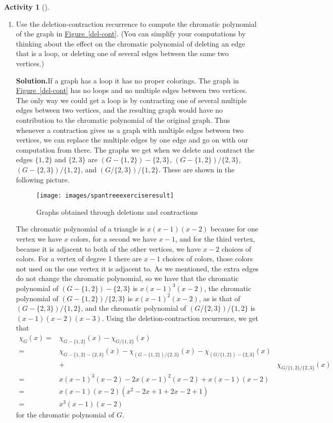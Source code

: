 \documentclass[10pt,]{book}
\theoremstyle{plain}
\theoremstyle{definition}
\newtheorem{activity}[project]{Activity}
\numberwithin{equation}{chapter}
\newcommand{\amp}{&}
\begin{document}
\begin{activity}[]
\begin{enumerate}[label=(\alph*)]
~\par
\item Use the deletion-contraction recurrence to compute the chromatic polynomial of the graph in \hyperref[del-cont]{Figure~\ref{del-cont}}. (You can simplify your computations by thinking about the effect on the chromatic polynomial of deleting an edge that is a loop, or deleting one of several edges between the same two vertices.)%
\par\medskip\noindent%
\textbf{Solution.}\quad If a graph has a loop it has no proper colorings. The graph in \hyperref[del-cont]{Figure~\ref{del-cont}} has no loops and no multiple edges between two vertices. The only way we could get a loop is by contracting one of several multiple edges between two vertices, and the resulting graph would have no contribution to the chromatic polynomial of the original graph. Thus whenever a contraction gives us a graph with multiple edges between two vertices, we can replace the multiple edges by one edge and go on with our computation from there. The graphs we get when we delete and contract the edges \(\{1,2\}\) and \(\{2,3\}\) are \((G-\{1,2\})-\{2,3\}\), \((G-\{1,2\})/\{2,3\}\), \((G-\{2,3\})/\{1,2\}\), and \((G/\{2,3\})/\{1,2\}\). These are shown in the following picture.%
\begin{figure}
\centering
\texttt{[image: images/spantreeexerciseresult]}
\caption{Graphs obtained through deletions and contractions\label{delete-contract}}
\end{figure}
The chromatic polynomial of a triangle is \(x(x-1)(x-2)\) because for one vertex we have \(x\) colors, for a second we have \(x-1\), and for the third vertex, because it is adjacent to both of the other vertices, we have \(x-2\) choices of colors. For a vertex of degree 1 there are \(x-1\) choices of colors, those colors not used on the one vertex it is adjacent to. As we mentioned, the extra edges do not change the chromatic polynomial, so we have that the chromatic polynomial of \((G-\{1,2\})-\{2,3\}\) is \(x(x-1)^3(x-2)\), the chromatic polynomial of \((G-\{1,2\})/\{2,3\}\) is \(x(x-1)^2(x-2)\), as is that of \((G-\{2,3\})/\{1,2\}\), and the chromatic polynomial of \((G/\{2,3\})/\{1,2\}\) is \((x-1)(x-2)(x-3)\). Using the deletion-contraction recurrence, we get that%
\begin{align*}
\chi_G(x)  =\amp  \chi_{G-\{1,2\}}(x) - \chi_{G/\{1,2\}}(x)\\
=\amp
\chi_{G-\{1,2\}-\{2,3\}}(x)-\chi_{(G-\{1,2\})/\{2,3\}}(x)-
\chi_{(G/\{1,2\})-\{2,3\}}(x)\\
\amp +\amp  \chi_{G/\{1,2\}/\{2,3\}}(x)\\
=\amp  x(x-1)^3(x-2)-2x(x-1)^2(x-2) + x(x-1)(x-2)\\
=\amp  x(x-1)(x-2)(x^2-2x+1 +2x-2 +1)\\
=\amp  x^3(x-1)(x-2)
\end{align*}
for the chromatic polynomial of \(G\).%


\end{enumerate}
\end{activity}
\end{document}
